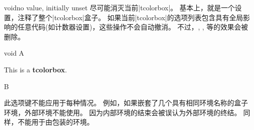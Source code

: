 \begin{docTcbKey}[][doc new=2016-10-21]{void}{}{no value, initially unset}
尽可能消灭当前|tcolorbox|。%
基本上，就是一个设置，注释了整个|tcolorbox|盒子。%
如果当前|tcolorbox|的选项列表包含具有全局影响的任意代码(如计数器设置)，这些操作不会自动撤消。%
不过，, ,   等的效果会被删除。

\begin{exdispExample}{void}
A%
  \begin{tcolorbox}[
      title=This box is completely removed by the following key,
      void
    ]
  This is a \textbf{tcolorbox}.
  \end{tcolorbox}
B
\end{exdispExample}

\begin{marker}

此选项键不能应用于每种情况。%
例如，如果嵌套了几个具有相同环境名称的盒子环境，外部环境不能使用。%
因为内部环境的结束会被误认为外部环境的终结。%
同样，不能用于由包装的环境。
\end{marker}
\end{docTcbKey}




